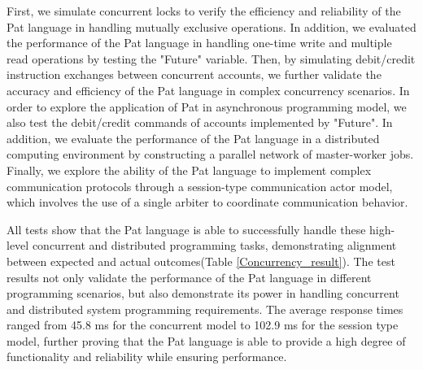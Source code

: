 \documentclass{l4proj}
\begin{document}
First, we simulate concurrent locks to verify the efficiency and reliability of the Pat language in handling mutually exclusive operations. In addition, we evaluated the performance of the Pat language in handling one-time write and multiple read operations by testing the "Future" variable. Then, by simulating debit/credit instruction exchanges between concurrent accounts, we further validate the accuracy and efficiency of the Pat language in complex concurrency scenarios. In order to explore the application of Pat in asynchronous programming model, we also test the debit/credit commands of accounts implemented by "Future". In addition, we evaluate the performance of the Pat language in a distributed computing environment by constructing a parallel network of master-worker jobs. Finally, we explore the ability of the Pat language to implement complex communication protocols through a session-type communication actor model, which involves the use of a single arbiter to coordinate communication behavior.

All tests show that the Pat language is able to successfully handle these high-level concurrent and distributed programming tasks, demonstrating alignment between expected and actual outcomes(Table \ref{Concurrency_result}). The test results not only validate the performance of the Pat language in different programming scenarios, but also demonstrate its power in handling concurrent and distributed system programming requirements. The average response times ranged from 45.8 ms for the concurrent model to 102.9 ms for the session type model, further proving that the Pat language is able to provide a high degree of functionality and reliability while ensuring performance.
\begin{table}[ht]
\centering
\renewcommand{\arraystretch}{1.1}
\caption{Advanced Concurrency Model Correct Test Results \colorbox{yellow}{referenceHere}}
\label{Concurrency_result}
\end{table}
\end{document}
